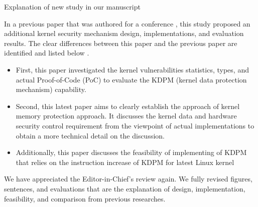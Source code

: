 \documentclass[11pt,a4paper]{article}
\begin{document}


\begin{itembox}[l]{Explanation of new study in our manuscript}

In a previous paper that was authored for a conference \cite{kuzuno22iwsec},
this study proposed an additional kernel security mechanism design,
implementations, and evaluation results.  The clear differences between this
paper and the previous paper are identified and listed below \cite{kuzuno22iwsec}.

\begin{itemize}
  \item First, this paper investigated the kernel vulnerabilities statistics,
  types, and actual Proof-of-Code (PoC) to evaluate the 
  KDPM (kernel data protection mechanism) capability.
  
  \item Second, this latest paper aims to clearly establish the approach of
  kernel memory protection approach. It discusses the kernel data and hardware
  security control requirement from the viewpoint of actual implementations
  to obtain a more technical detail on the discussion.

\item Additionally, this paper discusses the feasibility of implementing of KDPM
  that relies on the instruction increase of KDPM for latest Linux kernel 

\end{itemize}
  

\end{itembox}

We have appreciated the Editor-in-Chief's review again. We fully revised
figures, sentences, and evaluations that are the explanation of design,
implementation, feasibility, and comparison from previous researches.
\end{document}
